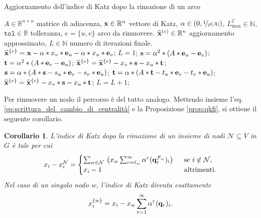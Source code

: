 \documentclass[a4paper]{article}
\newcommand{\NN}{\mathbb{N}}
\newcommand{\RR}{\mathbb{R}}
\newcommand{\evec}{{\bf e}}
\newcommand{\qvec}{{\bf q}}
\newcommand{\xvec}{{\bf x}}
\newcommand{\cE}{\mathcal{E}}
\newcommand{\cN}{\mathcal{N}}
\newcommand{\cF}{\mathcal{F}}
\newcommand{\se}{\text{se }}
\newcommand{\altrimenti}{\text{altrimenti}}
\newtheorem{corollary}{Corollario}
\begin{document}
	\begin{algorithm}[H]
		\caption{Aggiornamento dell'indice di Katz dopo la rimozione di un arco}
		\label{alg:arco}
		\begin{algorithmic}[1]
			\REQUIRE $A\in \RR^{n
				\times n}$ matrice di adiacenza, $\xvec\in \RR^{n}$ vettore di Katz, $\alpha \in (0, \nicefrac{1}{\rho(A)})$, $L_{\max}^{\cE} \in \NN$, $\texttt{tol}\in \RR$ tolleranza, $e=\{u,v\}$ arco da rimuovere.
			\ENSURE $\widehat{\xvec}^{(e)}\in \RR^{n}$ aggiornamento approssimato, $L\in \NN$ numero di iterazioni finale. 
			\STATE $\widehat{\xvec}^{\{e\}}=\xvec  - \alpha*x_v*\evec_u - \alpha*x_u*\evec_v$;
			\STATE $L=1$; 
			\STATE $\mathbf{s} = \alpha^2*(A*\evec_u -\evec_v)$;
			\STATE $\mathbf{t} = \alpha^2*(A*\evec_v - \evec_u)$;
			\STATE $\widehat{\xvec}^{\{e\}}= \widehat{\xvec}^{\{e\}} - x_v*\mathbf{s} - x_u *\mathbf{t}$;
			\WHILE {$\|x_v*\mathbf{s} + x_u *\mathbf{t}\|\,/\,\|\xvec\|_2  >  \texttt{tol}$ \AND  $L< L_{\max}^{\cE}$}
			\STATE $\mathbf{s} = \alpha *(A*\mathbf{s} - s_u *\evec_v - s_v *\evec_u)$; \label{line:matrix_vector_product_u_alg_2}
			\STATE $\mathbf{t} = \alpha *(A*\mathbf{t} - t_u *\evec_v - t_v *\evec_u)$; \label{line:matrix_vector_product_v_alg_2}
			\STATE $\widehat{\xvec}^{\{e\}}= \widehat{\xvec}^{\{e\}} - x_v*\mathbf{s} - x_u *\mathbf{t}$; 
			\STATE $L= L+1$;
			\ENDWHILE
		\end{algorithmic}
	\end{algorithm}
	
	Per rimuovere un nodo il percorso è del tutto analogo. Mettendo insieme
	l'eq. \eqref{eq:scrittura_del_cambio_di_centralità} e la Proposizione \ref{prop:qkfi}, si ottiene il seguente corollario.
	
	\begin{corollary}
		L'indice di Katz dopo la rimozione di un insieme di nodi $\cN \subseteq V$ in $G$ è tale per cui
		\begin{equation}
			x_i - x_i^{\cN} = 
			\begin{cases}
				\sum_{w\in \cN}\,
				\left( x_w  \sum_{r=\ell_w}^{\infty} \alpha^r
				(\qvec_r^{\cF_w})_{i}\right) & \;\; \se i\not\in\cN, \\
				x_i-1                        & \;\; \altrimenti.     
			\end{cases}
		\end{equation}
		Nel caso di un singolo nodo $w$, l'indice di Katz diventa
		esattamente
		\begin{equation} \label{eq:rimozione_nodo_finale}
			x_i^{\{w\}} = x_i - x_w \sum_{r=1}^\infty \alpha^r (\qvec_r)_i.
		\end{equation}
	\end{corollary}
	
\end{document}
